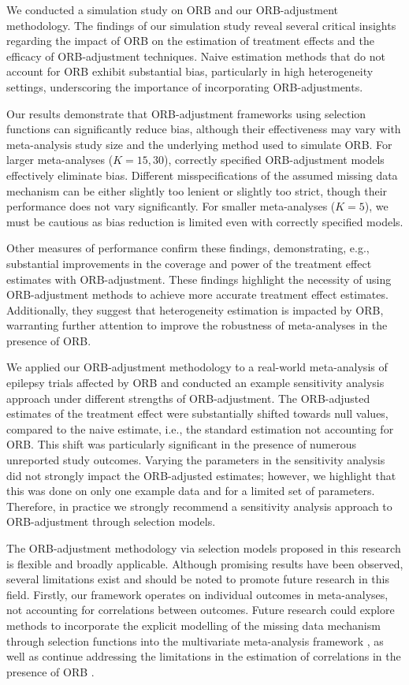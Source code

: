 \documentclass[twocolumn]{article}\usepackage[]{graphicx}\usepackage[]{xcolor}
\begin{document}
We conducted a simulation study on ORB and our ORB-adjustment methodology. The findings of our simulation study reveal several critical insights regarding the impact of ORB on the estimation of treatment effects and the efficacy of ORB-adjustment techniques. Naive estimation methods that do not account for ORB exhibit substantial bias, particularly in high heterogeneity settings, underscoring the importance of incorporating ORB-adjustments. 

Our results demonstrate that ORB-adjustment frameworks using selection functions can significantly reduce bias, although their effectiveness may vary with meta-analysis study size and the underlying method used to simulate ORB. For larger meta-analyses ($K= 15, 30$), correctly specified ORB-adjustment models effectively eliminate bias. Different misspecifications of the assumed missing data mechanism can be either slightly too lenient or slightly too strict, though their performance does not vary significantly. For smaller meta-analyses ($K=5$), we must be cautious as bias reduction is limited even with correctly specified models. 

Other measures of performance confirm these findings, demonstrating, e.g., substantial improvements in the coverage and power of the treatment effect estimates with ORB-adjustment. These findings highlight the necessity of using ORB-adjustment methods to achieve more accurate treatment effect estimates. Additionally, they suggest that heterogeneity estimation is impacted by ORB, warranting further attention to improve the robustness of meta-analyses in the presence of ORB. 

We applied our ORB-adjustment methodology to a real-world meta-analysis of epilepsy trials \citep{Copas2019, topiramate} affected by ORB and conducted an example sensitivity analysis approach under different strengths of ORB-adjustment. The ORB-adjusted estimates of the treatment effect were substantially shifted towards null values, compared to the naive estimate, i.e., the standard estimation not accounting for ORB. This shift was particularly significant in the presence of numerous unreported study outcomes. Varying the parameters in the sensitivity analysis did not strongly impact the ORB-adjusted estimates; however, we highlight that this was done on only one example data and for a limited set of parameters. Therefore, in practice we strongly recommend a sensitivity analysis approach to ORB-adjustment through selection models. 

The ORB-adjustment methodology via selection models proposed in this research is flexible and broadly applicable. Although promising results have been observed, several limitations exist and should be noted to promote future research in this field. Firstly, our framework operates on individual outcomes in meta-analyses, not accounting for correlations between outcomes. Future research could explore methods to incorporate the explicit modelling of the missing data mechanism through selection functions into the multivariate meta-analysis framework \citep{Liu2017, Hwang2018, Bay}, as well as continue addressing the limitations in the estimation of correlations in the presence of ORB \citep{Bay, Kirkham2012, Hwang2018, Liu2017}.
\end{document}
